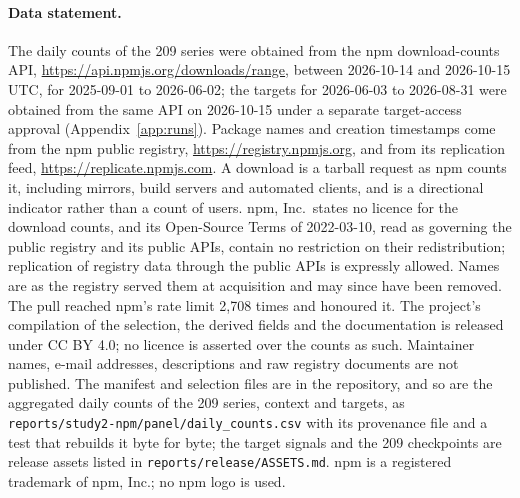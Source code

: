 \paragraph{Data statement.} The daily counts of the 209 series were obtained from the npm download-counts
API, \url{https://api.npmjs.org/downloads/range}, between 2026-10-14 and 2026-10-15 UTC, for 2025-09-01 to
2026-06-02; the targets for 2026-06-03 to 2026-08-31 were obtained from the same API on 2026-10-15 under a separate
target-access approval (Appendix~\ref{app:runs}). Package names and creation timestamps come from the npm public registry,
\url{https://registry.npmjs.org}, and from its replication feed, \url{https://replicate.npmjs.com}. A
download is a tarball request as npm counts it, including mirrors, build servers and automated clients, and
is a directional indicator rather than a count of users. npm, Inc.\ states no licence for the download
counts, and its Open-Source Terms of 2022-03-10, read as governing the public registry and its public APIs,
contain no restriction on their redistribution; replication of registry data through the public
APIs is expressly allowed. Names are as the registry served them at acquisition and may since have been
removed. The pull reached npm's rate limit 2,708 times and honoured it. The project's compilation of the
selection, the derived fields and the documentation is released under CC BY 4.0; no licence is asserted over
the counts as such. Maintainer names, e-mail addresses, descriptions and raw registry documents are not
published. The manifest and selection files are in the repository, and so are the aggregated daily counts
of the 209 series, context and targets, as \texttt{reports/study2-npm/panel/daily\_counts.csv} with its
provenance file and a test that rebuilds it byte for byte; the target signals and the 209 checkpoints are
release assets listed in \texttt{reports/release/ASSETS.md}. npm is a registered trademark of npm,
Inc.; no npm logo is used.
